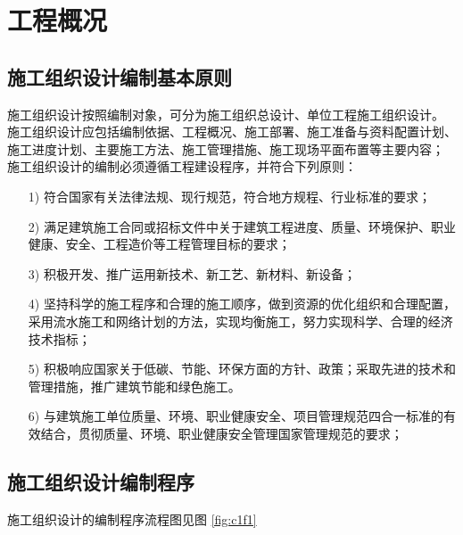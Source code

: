
\section{工程概况}
\subsection{施工组织设计编制基本原则}

施工组织设计按照编制对象，可分为施工组织总设计、单位工程施工组织设计。
施工组织设计应包括编制依据、工程概况、施工部署、施工准备与资料配置计划、
施工进度计划、主要施工方法、施工管理措施、施工现场平面布置等主要内容；
施工组织设计的编制必须遵循工程建设程序，并符合下列原则：

\begin{itemize}

    \item [1)] 符合国家有关法律法规、现行规范，符合地方规程、行业标准的要求；

    \item [2)] 满足建筑施工合同或招标文件中关于建筑工程进度、质量、环境保护、职业健康、安全、工程造价等工程管理目标的要求；

    \item [3)] 积极开发、推广运用新技术、新工艺、新材料、新设备；

    \item [4)] 坚持科学的施工程序和合理的施工顺序，做到资源的优化组织和合理配置，采用流水施工和网络计划的方法，实现均衡施工，努力实现科学、合理的经济技术指标；

    \item [5)] 积极响应国家关于低碳、节能、环保方面的方针、政策；采取先进的技术和管理措施，推广建筑节能和绿色施工。

    \item [6)] 与建筑施工单位质量、环境、职业健康安全、项目管理规范四合一标准的有效结合，贯彻质量、环境、职业健康安全管理国家管理规范的要求；

\end{itemize}

\subsection{施工组织设计编制程序}

施工组织设计的编制程序流程图见图 \ref{fig:c1f1}

